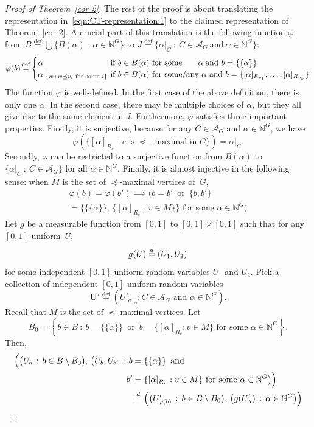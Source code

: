 \documentclass[10pt]{amsart}
\theoremstyle{definition}\newtheorem{defi}[theo]{Definition}\newtheorem{rema}[theo]{Remark}\newtheorem{exam}[theo]{Example}\newtheorem{exem}[theo]{Example}\newtheorem{nota}[theo]{Notation}
\newcommand*{\defeq}{\stackrel{\mathrm{def}}{=}}
\renewcommand{\d}{\buildrel{d}\over{=}}
\newcommand*\N{\mathbb{N}}
\renewcommand{\AA}{\mathcal{A}}
\newcommand*\bU{\mathbf{U}}
\begin{document}
\begin{proof}[Proof of Theorem~\ref{cor 2}]
The rest of the proof is about translating the representation in~\eqref{eqn:CT-representation:1} to the claimed representation of Theorem~\ref{cor 2}. A crucial part of this translation is the following function $\varphi$ from $B
\defeq \bigcup \{ B(\alpha)~:~\alpha \in \N^G\}$ to $J
\defeq \{\alpha|_C~:~C \in \AA_G \ \mbox{and}\ \alpha \in \N^G\}$:
\[
\varphi(b)\!
\defeq\!
\begin{cases}
\alpha & \!\!\!\!\text{if }b \in B(\alpha)\text{ for some}\mkern35mu\alpha\;\text{and }b = \{\{\alpha\}\}
\\
\alpha|_{\{w\,:\,w \preceq v_i \text{ for some }i \}} & \!\!\!\!\text{if } b \in B(\alpha) \text{ for some/any }\alpha \text{ and }b = 
\{[\alpha]_{R_{v_1}},\ldots,[\alpha]_{R_{v_k}}\}
\end{cases}
\]
The function $\varphi$ is well-defined. In the first case of the above definition, there is only one $\alpha$. In the second case, there may be multiple choices of $\alpha$, but they all give rise to the same element in $J$. Furthermore, $\varphi$ satisfies three important properties. Firstly, it is surjective, because for any $C \in \AA_G$ and $\alpha \in \N^G$, we have
\[
\varphi(\{[\alpha]_{R_v}~:~v \text{ is }\preceq-\text{maximal in }C\}) = \alpha|_C.
\]
\goodbreak
Secondly, $\varphi$ can be restricted to a surjective function from $B(\alpha)$
to $\{\alpha|_C~:~C \in \AA_G\}$ for all $\alpha \in \N^G$. Finally, it is almost injective in the following sense: when $M$ is the set of $\preceq$-maximal vertices
of~$G$,
\begin{multline*}
\varphi(b) = \varphi(b') \implies
\Big(b = b' \, \text{ or }\,
\big\{b,b'\big\}\\
= \big\{\{\{\alpha\}\},\,\{[\alpha]_{R_v}~:~v \in M\}\big\}\text{ for some }\alpha \in \N^G\Big)
\end{multline*}
Let $g$ be a measurable function from $[0,1]$ to $[0,1] \times [0,1]$ such that for any $[0,1]$-uniform~$U$,
\[
g(U) \d (U_1,U_2)
\]
for some independent $[0,1]$-uniform random variables $U_1$ and $U_2$. Pick a collection of independent $[0,1]$-uniform
random variables
\[
\bU'
\defeq \left(U'_{\alpha|_C} : C \in \AA_G\text{ and }\alpha \in \N^G\right).
\]
Recall that $M$ is the set of $\preceq$-maximal vertices. Let
\[
B_0 = \left\{b \in B~:~b = \{\{\alpha\}\}\, \text{ or }\, b = \{[\alpha]_{R_v} : v \in M\} \text{ for some }
\alpha \in \N^G\right\}.
\]
Then,
\begin{align*}
\Big(\big(U_b\,:\,b \in B \setminus B_0\big),\,
\big(U_b, U_{b'}\,:\,
b &= \{\{\alpha\}\} \,\text{ and }\,
\\ b' &= \{[\alpha]_{R_v} : v \in M\} \text{ for some } \alpha \in \N^G\big)\Big)
\\
&\d \Big(\big(U'_{\varphi(b)}\,:\,b \in B \setminus B_0\big),\,
\big(g(U'_\alpha)\,:\,\alpha \in \N^G\big)\Big)
\end{align*}


\end{proof}
\end{document}
